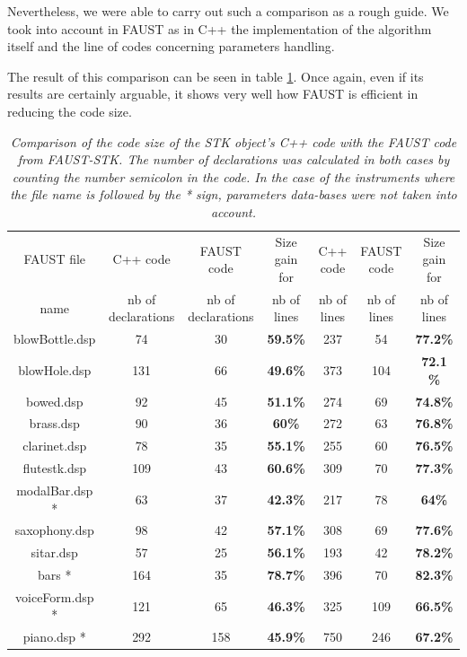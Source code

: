 \documentclass[twoside,a4paper]{article}
\begin{document}
Nevertheless, we were able to carry out such a comparison as a rough
guide. We took into account in FAUST as in C++ the implementation of the
algorithm itself and the line of codes concerning parameters
handling. 

The result of this comparison can be seen in table \ref{tab:nblines}. Once again, even if its results are certainly arguable, it
shows very well how FAUST is efficient in reducing the code
size. 

\begin{table}[ht]
\begin{center}
\begin{tabular}{c c c c c c c}
\hline
\hline
FAUST file & C++ code & FAUST code & Size gain for & C++ code & FAUST code
& Size gain for\\
name & nb of declarations & nb of declarations & nb of lines & nb of lines & nb of
lines & nb of lines\\
\hline
blowBottle.dsp  & 74 & 30 & {\bf 59.5\%} & 237 & 54 & {\bf 77.2\%} \\
blowHole.dsp & 131 & 66 & {\bf 49.6\%} & 373 & 104 & {\bf 72.1 \%} \\
bowed.dsp &  92 & 45 & {\bf 51.1\%} & 274 & 69 & {\bf 74.8\%} \\
brass.dsp & 90 & 36 & {\bf 60\%} & 272 & 63 & {\bf 76.8\%} \\
clarinet.dsp & 78 & 35 & {\bf 55.1\%} & 255 & 60 & {\bf 76.5\%} \\
flutestk.dsp & 109 & 43 & {\bf 60.6\%} & 309 & 70 & {\bf 77.3\%} \\
modalBar.dsp * & 63 & 37 & {\bf 42.3\%} & 217 & 78 & {\bf 64\%} \\
saxophony.dsp & 98 & 42 & {\bf 57.1\%} & 308 & 69 & {\bf 77.6\%} \\
sitar.dsp & 57 & 25 & {\bf 56.1\%} & 193 & 42 & {\bf 78.2\%} \\
bars * & 164 & 35 & {\bf 78.7\%} & 396 & 70 & {\bf 82.3\%} \\
voiceForm.dsp * & 121 & 65 & {\bf 46.3\%} & 325 & 109 & {\bf 66.5\%} \\
piano.dsp * & 292 & 158 & {\bf 45.9\%} & 750 & 246 & {\bf 67.2\%} \\
\hline
\end{tabular}
\end{center}
\caption{{\it Comparison of the code size of the STK object's C++ code
    with the FAUST code from FAUST-STK. The number of declarations was
    calculated in both cases by counting the number semicolon in the
    code. In the case of the
    instruments where the file name is followed by the
  * sign, parameters data-bases were not taken into account.}}
\label{tab:nblines}
\end{table}
\end{document}
